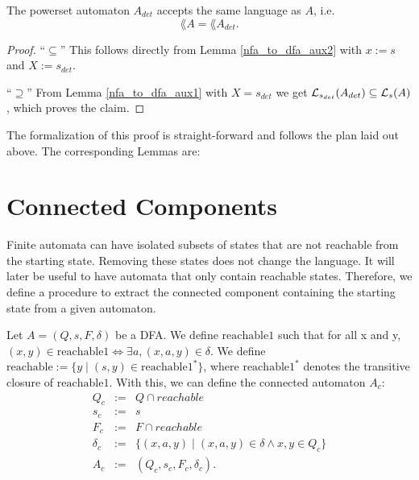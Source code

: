 \begin{theorem}
    \label{nfa_to_dfa}
    The powerset automaton $A_{det}$ accepts the same language as $A$, i.e.
    \begin{equation*}        
        \lang{A} = \lang{A_{det}}.        
    \end{equation*}
\end{theorem}
\begin{proof}
    ``$\subseteq$'' 
    This follows directly from Lemma \ref{nfa_to_dfa_aux2} with $x := s$ and $X := {s}_{det}$.

    ``$\supseteq$''
    From Lemma \ref{nfa_to_dfa_aux1} with $X = {s}_{det}$ we get 
    $\mathcal{L}_{s_{det}}(A_{det}) \subseteq \mathcal{L}_{s}(A)$, which proves the claim.
\end{proof}


The formalization of this proof is straight-forward and follows the plan laid out above. 
The corresponding Lemmas are:


\section{Connected Components}
 
Finite automata can have isolated subsets of states that are not reachable from the starting state. 
Removing these states does not change the language.
It will later be useful to have automata that only contain reachable states. 
Therefore, we define a procedure to extract the connected component containing the starting state from a given automaton.

\begin{definition}
    \label{A_c}
    Let $A = (Q, s, F, \delta)$ be a DFA.
    We define $\mathrm{reachable1}$ such that for all x and y, 
    $(x,y) \in \mathrm{reachable1} \iff \exists a, (x,a,y) \in \delta$.
    We define $\mathrm{reachable} := \{y \; | \; (s,y) \in \mathrm{reachable1}^*\}$, 
    where $\mathrm{reachable1}^*$ denotes the transitive closure of $\mathrm{reachable1}$.
    With this, we can define the connected automaton $A_c$:
    \begin{eqnarray*}
        Q_c & := & Q \cap reachable \\
        s_c & := & s \\
        F_c & := & F \cap reachable \\
        \delta_c & := & \{(x, a, y) \; | \; (x, a, y) \in \delta \wedge x,y \in Q_c \} \\
        A_c &:=& (Q_c, s_c, F_c, \delta_c).
    \end{eqnarray*}
\end{definition}


